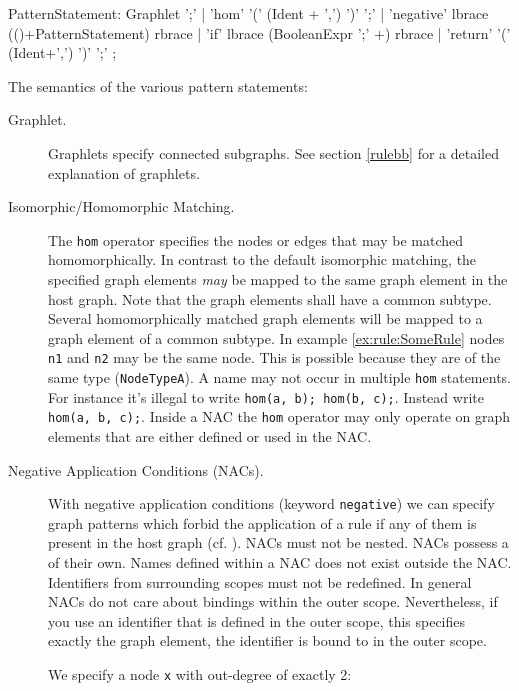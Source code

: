 \begin{rail}  
  PatternStatement: 
    Graphlet ';' |
    'hom' '(' (Ident + ',') ')' ';' |
    'negative' lbrace (()+PatternStatement) rbrace |
    'if' lbrace (BooleanExpr ';' +) rbrace |
    'return' '(' (Ident+',') ')' ';' ;
\end{rail}
The semantics of the various pattern statements:
\begin{description}
  \item[Graphlet.] Graphlets specify connected subgraphs. See section \ref{rulebb} for a detailed explanation of graphlets. 
  \item[Isomorphic/Homomorphic Matching.] The \texttt{hom} operator specifies the nodes or edges that may be matched homomorphically. 
  In contrast to the default isomorphic matching, the specified graph elements \emph{may} be mapped to the same graph element in the host graph. Note that the graph elements shall have a common subtype. 
  Several homomorphically matched graph elements will be mapped to a graph element of a common subtype.
  In example \ref{ex:rule:SomeRule} nodes \texttt{n1} and \texttt{n2} may be the same node. This is possible because they are of the same type (\texttt{NodeTypeA}).
  A name may not occur in multiple \texttt{hom} statements. 
  For instance it's illegal to write \texttt{hom(a, b); hom(b, c);}. Instead write \texttt{hom(a, b, c);}. 
  Inside a NAC the \texttt{hom} operator may only operate on graph elements that are either defined or used in the NAC.
  \item[Negative Application Conditions (NACs).] With negative application conditions (keyword \texttt{negative}) we can specify graph patterns which forbid the application of a rule if any of them is present in the host graph (cf. \cite{adam}). 
  NACs must not be nested.
  NACs possess a  of their own. 
  Names defined within a NAC does not exist outside the NAC. 
  Identifiers from surrounding scopes must not be redefined.
  In general NACs do not care about bindings within the outer scope. 
  Nevertheless, if you use an identifier that is defined in the outer scope, this specifies exactly the graph element, the identifier is bound to in the outer scope.
  \begin{example}
    We specify a node \texttt{x} with out-degree of exactly 2:

\end{example}
\end{description}
